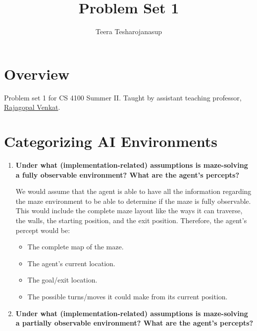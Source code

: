 \documentclass[a4paper]{article}
\begin{document}
\title{\textbf{\huge{Problem Set 1}}}

\author{\textbf\large{Teera Tesharojanasup}}


\date{}

\maketitle
\begin{sloppypar}

\section*{Overview}

Problem set 1 for CS 4100 Summer II. Taught by assistant teaching professor, \href{https://rajagopalvenkat.com/}{Rajagopal Venkat}. \cite{MISC:1}

\section{Categorizing AI Environments}

\begin{enumerate}[start=1,label=Q\arabic*,left=0pt]
    \item \textbf{Under what (implementation-related) assumptions is maze-solving a fully observable environment? What are the agent’s percepts?}
    
    \par We would assume that the agent is able to have all the information regarding the maze environment to be able to determine if the maze
    is fully observable. 
    This would include the complete maze layout like the ways it can traverse, the walls, the starting position, and the exit position.
    Therefore, the agent's percept would be:
    \begin{itemize}
        \item The complete map of the maze.
        \item The agent's current location.
        \item The goal/exit location.
        \item The possible turns/moves it could make from its current position.
    \end{itemize}
    
    \item \textbf{Under what (implementation-related) assumptions is maze-solving a partially observable environment? What are the agent’s percepts?}
    

\end{enumerate}
\end{sloppypar}
\end{document}
